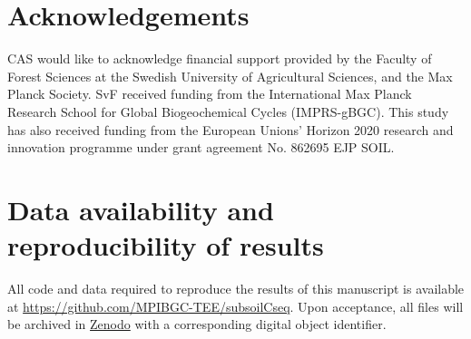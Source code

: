 \documentclass[11pt, oneside, a4paper]{article}   	%
\begin{document}
\section*{Acknowledgements}
CAS would like to acknowledge financial support provided by the Faculty of Forest Sciences at the Swedish University of Agricultural Sciences, and the Max Planck Society. SvF received funding from the International Max Planck Research School for Global Biogeochemical Cycles (IMPRS-gBGC). This study has also received funding from the European Unions’ Horizon 2020 research and innovation programme under grant agreement No. 862695 EJP SOIL.

\section*{Data availability and reproducibility of results}
All code and data required to reproduce the results of this manuscript is available at \url{https://github.com/MPIBGC-TEE/subsoilCseq}. Upon acceptance, all files will be archived in \href{https://zenodo.org/}{Zenodo} with a corresponding digital object identifier. 




\end{document}
